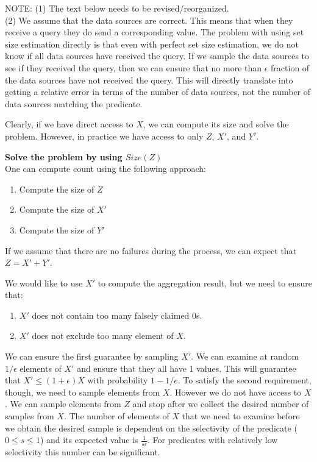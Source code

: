 \documentclass{article}
\begin{document}
NOTE: (1) The text below needs to be revised/reorganized.\\

      (2) We assume that the data sources are correct. This means that
          when they receive a query they do send a corresponding
          value. The problem with using set size estimation directly
          is that even with perfect set size estimation, we do not
          know if all data sources have received the query. If we
          sample the data sources to see if they received the query,
          then we can ensure that no more than $\epsilon$ fraction of
          the data sources have not received the query. This will
          directly translate into getting a relative error in terms of
          the number of data sources, not the number of data sources
          matching the predicate. 


Clearly, if we have direct access to $X$, we can compute its size and
solve the problem. However,  in practice we have access to only $Z$, $X'$,
and $Y'$.

{\bf Solve the problem by using $Size(Z)$}\\
One can compute count using the following approach:
\begin{enumerate}
  \item Compute the size of $Z$
  \item Compute the size of $X'$
  \item Compute the size of $Y'$
\end{enumerate}

If we assume that there are no failures during the process, we can
expect that $Z = X' + Y'$.


We would like to use $X'$ to compute the aggregation result, but
we need to ensure that:

\begin{enumerate}
  \item $X'$ does not contain too many falsely claimed 0s.
  \item $X'$ does not exclude too many element of $X$.
\end{enumerate}

We can ensure the first guarantee by sampling $X'$. We can examine at
random $1/\epsilon$ elements of $X'$ and ensure that they all have 1
values. This will guarantee that $X' \leq (1+\epsilon) X$ with probability
$1-1/e$. To satisfy the second requirement, though, we need to sample
elements from $X$. However we do not have access to $X$. We can sample
elements from $Z$ and stop after we collect the desired number of
samples from $X$. The number of elements of $X$ that we need to
examine before we obtain the desired sample is dependent on the
selectivity of the predicate ($0\leq s \leq 1$) and its expected value
is $\frac{1}{s\epsilon}$. For predicates with relatively low
selectivity this number can be significant.
\end{document}
